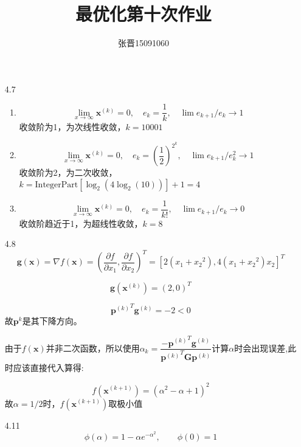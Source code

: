 \documentclass[UTF8]{ctexart}
\title{\heiti 最优化第十次作业}
\author{\kaishu 张晋15091060}
\begin{document}
\maketitle
\begin{enumerate}
\item[4.7]
\begin{enumerate}
\item \[\lim_{x\rightarrow \infty}\bm{x}^{(k)}=0,\quad e_k=\dfrac{1}{k},\quad \lim e_{k+1}/e_{k}\rightarrow 1\]
收敛阶为1，为次线性收敛，$k=10001$

\item \[\lim_{x\rightarrow \infty}\bm{x}^{(k)}=0,\quad e_k=(\dfrac{1}{2})^{2^k},\quad \lim e_{k+1}/e_{k}^2\rightarrow 1\]
收敛阶为2，为二次收敛，$k=\text{IntegerPart}\left[\log _2\left(4 \log _2(10)\right)\right]+1=4$

\item \[\lim_{x\rightarrow \infty}\bm{x}^{(k)}=0,\quad e_k=\dfrac{1}{k!},\quad \lim e_{k+1}/e_{k}\rightarrow 0\]
收敛阶趋近于1，为超线性收敛，$k=8$
\end{enumerate}

\item[4.8]
\begin{equation}
\bm{g}(\bm{x})=\nabla f(\bm{x})=(\dfrac{\partial f}{\partial x_1},\dfrac{\partial f}{\partial x_2})^T=[2(x_1+{x_2}^2),4(x_1+{x_2}^2)x_2]^T
\end{equation}

\begin{equation}
\bm{g}(\bm{x}^{(k)})=(2,0)^T
\end{equation}

\begin{equation}
{\bm{p}^{(k)}}^T\bm{g}^{(k)}=-2<0
\end{equation}
故$\bm{p}^{k}$是其下降方向。

由于$f(\bm{x})$并非二次函数，所以使用$\alpha_k=\dfrac{{-{\bm{p}^{(k)}}^T}\bm{g}^{(k)}}{{\bm{p}^{(k)}}^T\bm{G}\bm{p}^{(k)}}$计算$\alpha$时会出现误差,此时应该直接代入算得:

\begin{equation}
f(\bm{x}^{(k+1)})=(\alpha^2-\alpha+1)^2
\end{equation}
故$\alpha=1/2$时，$f(\bm{x}^{(k+1)})$取极小值


\item[4.11]
\begin{equation}
\phi(\alpha)=1-\alpha e^{-\alpha^2},\qquad \phi(0)=1
\end{equation}


\end{enumerate}
\end{document}
